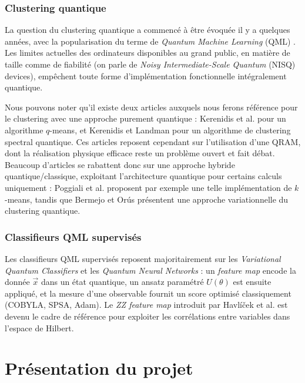 \documentclass[a4paper]{article}
\begin{document}
\subsubsection{Clustering quantique}

La question du clustering quantique a commencé à être évoquée il y a quelques années, avec la popularisation du terme de \emph{Quantum Machine Learning} (QML) \cite{qml_survey}. Les limites actuelles des ordinateurs disponibles au grand public, en matière de taille comme de fiabilité (on parle de \emph{Noisy Intermediate-Scale Quantum} (NISQ) devices), empêchent toute forme d'implémentation fonctionnelle intégralement quantique.

Nous pouvons noter qu'il existe deux articles auxquels nous ferons référence pour le clustering avec une approche purement quantique : Kerenidis et al. \cite{kerenidis_qmeans} pour un algorithme $q$-means, et Kerenidis et Landman \cite{kerenidis_spectral} pour un algorithme de clustering spectral quantique. Ces articles reposent cependant sur l'utilisation d'une QRAM, dont la réalisation physique efficace reste un problème ouvert et fait débat. Beaucoup d'articles se rabattent donc sur une approche hybride quantique/classique, exploitant l'architecture quantique pour certains calculs uniquement : Poggiali et al. \cite{poggiali_kmeans} proposent par exemple une telle implémentation de $k$-means, tandis que Bermejo et Orús \cite{bermejo_orus} présentent une approche variationnelle du clustering quantique.

\subsubsection{Classifieurs QML supervisés}

Les classifieurs QML supervisés reposent majoritairement sur les \emph{Variational Quantum Classifiers} et les \emph{Quantum Neural Networks} : un \emph{feature map} encode la donnée $\vec{x}$ dans un état quantique, un ansatz paramétré $U(\theta)$ est ensuite appliqué, et la mesure d'une observable fournit un score optimisé classiquement (COBYLA, SPSA, Adam). Le \emph{ZZ feature map} introduit par Havlíček et al. \cite{havlicek2019} est devenu le cadre de référence pour exploiter les corrélations entre variables dans l'espace de Hilbert.

\section{Présentation du projet}
\end{document}
